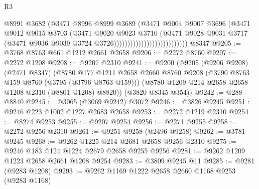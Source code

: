 \begin{lexlean}{R3}
\begin{coremodule}
                                              @8991
                                              @3682
                                              (@3471
                                                @8996
                                                @8999
                                                @3689
                                                (@3471
                                                  @9004
                                                  @9007
                                                  @3696
                                                  (@3471
                                                    @9012
                                                    @9015
                                                    @3703
                                                    (@3471
                                                      @9020
                                                      @9023
                                                      @3710
                                                      (@3471
                                                        @9028
                                                        @9031
                                                        @3717
                                                        (@3471
                                                          @9036
                                                          @9039
                                                          @3724
                                                          @3726)))))))))))))))))))))))))))
    @8347
@9205 := @3768 @8763 @661 @1212 @2661 @2658
@9206 := @2272 @8760
@9207 := @2272 @1208
@9208 := @9207 @2310
@9241 := @9200
    (@9205
      (@9206 @9208)
      (@2471 @8347)
      (@8780
        @177
        @1211
        @2658
        @2660
        @8760
        @9208
        (@3790 @8763 @159 @8760 (@3795 (@3796 @8763 @159)))
        (@8780 @1209 @214 @2658 @2658 @1208 @2310 (@8801 @1208) @8820))
      (@3820 @8345 @354))
@9242 := @288 @8840
@9245 := @3065 (@3069 @9242) @3072
@9246 := @3826 @9245
@9251 := @9246 @223 @1002 @1227 @2683 @2658
@9253 := @2272 @1219 @2310
@9254 := @8274 @9253
@9255 := @9207 @9254
@9256 := @2271 @9255
@9258 := @2272 @9256 @2310
@9261 := @9251 @9258 (@2496 @9258)
@9262 := @3781 @9245
@9268 := @9262 @1225 @214 @2681 @2658 @9256 @2310
@9275 := @9246 @183 @124 @1224 @2679 @2658 @9255 @9256
@9281 := @9262 @1209 @1223 @2658 @2661 @1208 @9254
@9283 := @3809 @9245 @11
@9285 := @9281 (@9283 @1208)
@9293 := @9262 @1169 @1222 @2658 @2660 @1168 @9253 (@9283 @1168)

\end{coremodule}
\end{lexlean}
